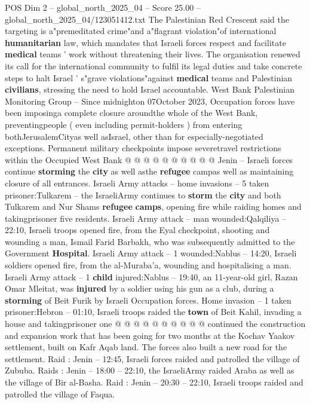 \begin{textsample}{POS Dim 2 – global\_north\_2025\_04 – Score 25.00 – global\_north\_2025\_04/123051412.txt}
The Palestinian Red Crescent said the targeting is a"premeditated crime"and a"flagrant violation"of international \textbf{humanitarian} law, which mandates that Israeli forces respect and facilitate \textbf{medical} teams ' work without threatening their lives.
The organisation renewed its call for the international community to fulfil its legal duties and take concrete steps to halt Israel ' s"grave violations"against \textbf{medical} teams and Palestinian \textbf{civilians}, stressing the need to hold Israel accountable.
West Bank Palestinian Monitoring Group -- Since midnighton 07October 2023, Occupation forces have been imposinga complete closure aroundthe whole of the West Bank, preventingpeople ( even including permit-holders ) from entering bothJerusalemCityas well asIsrael, other than for especially-negotiated exceptions.
Permanent military checkpoints impose severetravel restrictions within the Occupied West Bank @ @ @ @ @ @ @ @ @ @ Jenin -- Israeli forces continue \textbf{storming} the \textbf{city} as well asthe \textbf{refugee} campas well as maintaining closure of all entrances.
Israeli Army attacks -- home invasions -- 5 taken prisoner:Tulkarem -- the IsraeliArmy continues to \textbf{storm} the \textbf{city} and both Tulkarem and Nur Shams \textbf{refugee} \textbf{camps}, opening fire while raiding homes and takingprisoner five residents.
Israeli Army attack -- man wounded:Qalqiliya -- 22:10, Israeli troops opened fire, from the Eyal checkpoint, shooting and wounding a man, Ismail Farid Barbakh, who was subsequently admitted to the Government \textbf{Hospital}.
Israeli Army attack -- 1 wounded:Nablus -- 14:20, Israeli soldiers opened fire, from the al-Muraba'a, wounding and hospitalising a man.
Israeli Army attack -- 1 \textbf{child} injured:Nablus -- 19:40, an 11-year-old girl, Razan Omar Mleitat, was \textbf{injured} by a soldier using his gun as a club, during a \textbf{storming} of Beit Furik by Israeli Occupation forces.
Home invasion -- 1 taken prisoner:Hebron -- 01:10, Israeli troops raided the \textbf{town} of Beit Kahil, invading a house and takingprisoner one @ @ @ @ @ @ @ @ @ @ continued the construction and expansion work that has been going for two months at the Kochav Yaakov settlement, built on Kafr Aqab land.
The forces also built a new road for the settlement.
Raid : Jenin -- 12:45, Israeli forces raided and patrolled the village of Zububa.
Raids : Jenin -- 18:00 -- 22:10, the IsraeliArmy raided Araba as well as the village of Bir al-Basha.
Raid : Jenin -- 20:30 -- 22:10, Israeli troops raided and patrolled the village of Faqua.

\end{textsample}
